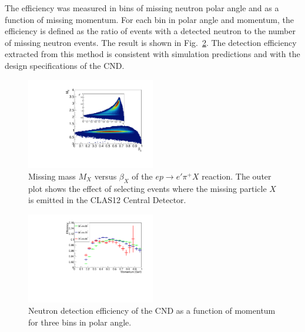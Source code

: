 The efficiency was measured in bins of missing neutron polar angle and as a function of missing momentum. For each bin in polar angle and momentum, the efficiency is defined as the ratio of events with a detected neutron to the number of missing neutron events. The result is shown in Fig.~\ref{fig_performance_efficiency}. The detection efficiency extracted from this method is consistent with simulation predictions and with the design specifications of the CND.

\begin{figure}[htb]  
\begin{center}
\includegraphics[width=0.5\textwidth]{Figure/SelectionPlots.pdf}
\caption {Missing mass $M_X$ versus $\beta_X$ of the $e p \to e'\pi^+X$ reaction. The outer plot shows the effect of selecting events where the missing particle $X$ is emitted in the CLAS12 Central Detector.}
\label{fig_performance_selection}
\end{center}
\end{figure}

\begin{figure}[htb]  
\begin{center}
\includegraphics[width=0.5\textwidth]{Figure/newEfficiency.pdf}
\caption {Neutron detection efficiency of the CND as a function of momentum for three bins in polar angle.}
\label{fig_performance_efficiency}
\end{center}
\end{figure}

